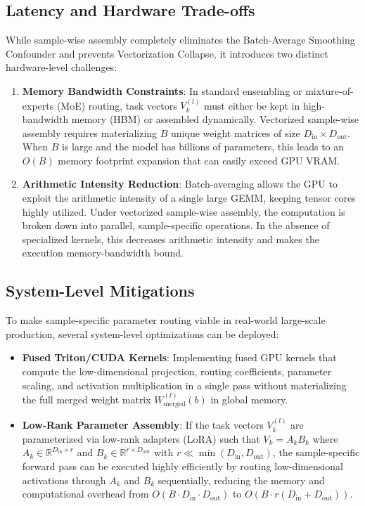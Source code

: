 \documentclass{article}
\theoremstyle{plain}
\theoremstyle{definition}
\theoremstyle{remark}
\begin{document}
\subsection{Latency and Hardware Trade-offs}
While sample-wise assembly completely eliminates the Batch-Average Smoothing Confounder and prevents Vectorization Collapse, it introduces two distinct hardware-level challenges:
\begin{enumerate}
    \item \textbf{Memory Bandwidth Constraints}: In standard ensembling or mixture-of-experts (MoE) routing, task vectors $V_k^{(l)}$ must either be kept in high-bandwidth memory (HBM) or assembled dynamically. Vectorized sample-wise assembly requires materializing $B$ unique weight matrices of size $D_{\text{in}} \times D_{\text{out}}$. When $B$ is large and the model has billions of parameters, this leads to an $O(B)$ memory footprint expansion that can easily exceed GPU VRAM.
    \item \textbf{Arithmetic Intensity Reduction}: Batch-averaging allows the GPU to exploit the arithmetic intensity of a single large GEMM, keeping tensor cores highly utilized. Under vectorized sample-wise assembly, the computation is broken down into parallel, sample-specific operations. In the absence of specialized kernels, this decreases arithmetic intensity and makes the execution memory-bandwidth bound.
\end{enumerate}

\subsection{System-Level Mitigations}
To make sample-specific parameter routing viable in real-world large-scale production, several system-level optimizations can be deployed:
\begin{itemize}
    \item \textbf{Fused Triton/CUDA Kernels}: Implementing fused GPU kernels that compute the low-dimensional projection, routing coefficients, parameter scaling, and activation multiplication in a single pass without materializing the full merged weight matrix $W_{\text{merged}}^{(l)}(b)$ in global memory.
    \item \textbf{Low-Rank Parameter Assembly}: If the task vectors $V_k^{(l)}$ are parameterized via low-rank adapters (LoRA) such that $V_k = A_k B_k$ where $A_k \in \mathbb{R}^{D_{\text{in}} \times r}$ and $B_k \in \mathbb{R}^{r \times D_{\text{out}}}$ with $r \ll \min(D_{\text{in}}, D_{\text{out}})$, the sample-specific forward pass can be executed highly efficiently by routing low-dimensional activations through $A_k$ and $B_k$ sequentially, reducing the memory and computational overhead from $O(B \cdot D_{\text{in}} \cdot D_{\text{out}})$ to $O(B \cdot r(D_{\text{in}} + D_{\text{out}}))$.
\end{itemize}
\end{document}
